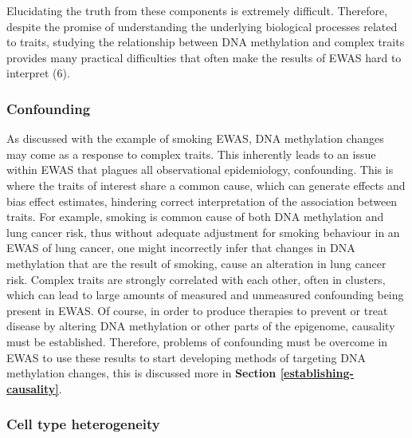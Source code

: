 \documentclass[11pt,oneside]{bristolthesis}
\begin{document}
Elucidating the truth from these components is extremely difficult. Therefore, despite the promise of understanding the underlying biological processes related to traits, studying the relationship between DNA methylation and complex traits provides many practical difficulties that often make the results of EWAS hard to interpret (6).

\hypertarget{confounding}{%
\subsubsection{Confounding}\label{confounding}}

As discussed with the example of smoking EWAS, DNA methylation changes may come as a response to complex traits. This inherently leads to an issue within EWAS that plagues all observational epidemiology, confounding. This is where the traits of interest share a common cause, which can generate effects and bias effect estimates, hindering correct interpretation of the association between traits. For example, smoking is common cause of both DNA methylation and lung cancer risk, thus without adequate adjustment for smoking behaviour in an EWAS of lung cancer, one might incorrectly infer that changes in DNA methylation that are the result of smoking, cause an alteration in lung cancer risk. Complex traits are strongly correlated with each other, often in clusters, which can lead to large amounts of measured and unmeasured confounding being present in EWAS. Of course, in order to produce therapies to prevent or treat disease by altering DNA methylation or other parts of the epigenome, causality must be established. Therefore, problems of confounding must be overcome in EWAS to use these results to start developing methods of targeting DNA methylation changes, this is discussed more in \textbf{Section \ref{establishing-causality}}.

\hypertarget{cell-type-heterogeneity}{%
\subsubsection{Cell type heterogeneity}\label{cell-type-heterogeneity}}
\end{document}
